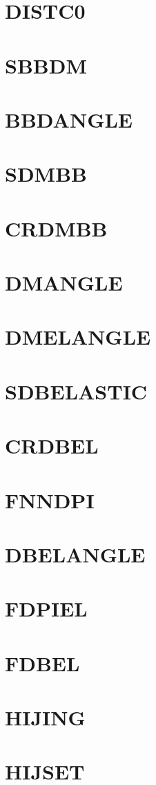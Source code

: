 \documentclass[14pt,UTF8]{ctexbook}
\begin{document}
\section{DISTC0}
\section{SBBDM}
\section{BBDANGLE}
\section{SDMBB}
\section{CRDMBB}
\section{DMANGLE}
\section{DMELANGLE}
\section{SDBELASTIC}
\section{CRDBEL}
\section{FNNDPI}
\section{DBELANGLE}
\section{FDPIEL}
\section{FDBEL}
\section{HIJING}
\section{HIJSET}
\end{document}
